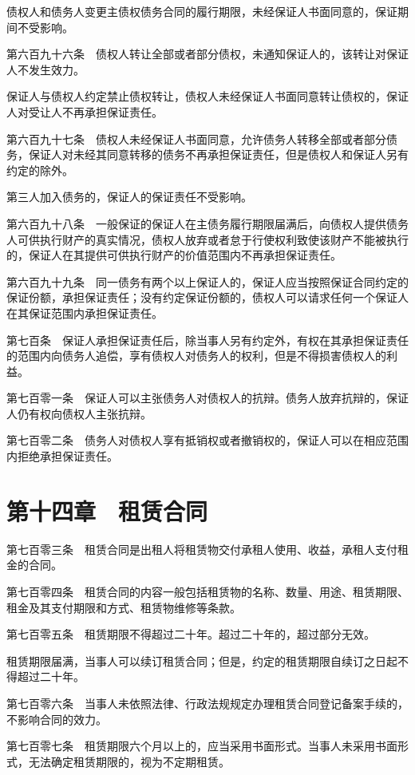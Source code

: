\documentclass[UTF8,12pt,a4paper]{ctexbook}
\begin{document}
债权人和债务人变更主债权债务合同的履行期限，未经保证人书面同意的，保证期间不受影响。

第六百九十六条　债权人转让全部或者部分债权，未通知保证人的，该转让对保证人不发生效力。

保证人与债权人约定禁止债权转让，债权人未经保证人书面同意转让债权的，保证人对受让人不再承担保证责任。

第六百九十七条　债权人未经保证人书面同意，允许债务人转移全部或者部分债务，保证人对未经其同意转移的债务不再承担保证责任，但是债权人和保证人另有约定的除外。

第三人加入债务的，保证人的保证责任不受影响。

第六百九十八条　一般保证的保证人在主债务履行期限届满后，向债权人提供债务人可供执行财产的真实情况，债权人放弃或者怠于行使权利致使该财产不能被执行的，保证人在其提供可供执行财产的价值范围内不再承担保证责任。

第六百九十九条　同一债务有两个以上保证人的，保证人应当按照保证合同约定的保证份额，承担保证责任；没有约定保证份额的，债权人可以请求任何一个保证人在其保证范围内承担保证责任。

第七百条　保证人承担保证责任后，除当事人另有约定外，有权在其承担保证责任的范围内向债务人追偿，享有债权人对债务人的权利，但是不得损害债权人的利益。

第七百零一条　保证人可以主张债务人对债权人的抗辩。债务人放弃抗辩的，保证人仍有权向债权人主张抗辩。

第七百零二条　债务人对债权人享有抵销权或者撤销权的，保证人可以在相应范围内拒绝承担保证责任。

\section*{第十四章　租赁合同}

第七百零三条　租赁合同是出租人将租赁物交付承租人使用、收益，承租人支付租金的合同。

第七百零四条　租赁合同的内容一般包括租赁物的名称、数量、用途、租赁期限、租金及其支付期限和方式、租赁物维修等条款。

第七百零五条　租赁期限不得超过二十年。超过二十年的，超过部分无效。

租赁期限届满，当事人可以续订租赁合同；但是，约定的租赁期限自续订之日起不得超过二十年。

第七百零六条　当事人未依照法律、行政法规规定办理租赁合同登记备案手续的，不影响合同的效力。

第七百零七条　租赁期限六个月以上的，应当采用书面形式。当事人未采用书面形式，无法确定租赁期限的，视为不定期租赁。
\end{document}
